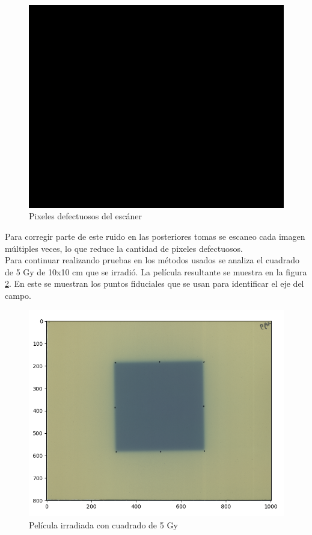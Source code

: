 \begin{figure}[H]
	\centering
	\includegraphics[width=0.7\linewidth]{images/FondoNegro.png}
	\caption{Pixeles defectuosos del escáner }
	\label{fig:fondoNegro}
\end{figure}

Para corregir parte de este ruido en las posteriores tomas se escaneo cada imagen múltiples veces, lo que reduce la cantidad de pixeles defectuosos.\\

Para continuar realizando pruebas en los métodos usados se analiza el cuadrado de 5 Gy de 10x10 cm que se irradió. La película resultante se muestra en la figura \ref{fig:cuadrado5Gy}. En este se muestran los puntos fiduciales que se usan para identificar el eje del campo.\\

\begin{figure}[H]
	\centering
	\includegraphics[width=0.7\linewidth]{images/peliculaCuadrado.png}
	\caption{Película irradiada con cuadrado de 5 Gy }
	\label{fig:cuadrado5Gy}
\end{figure}

